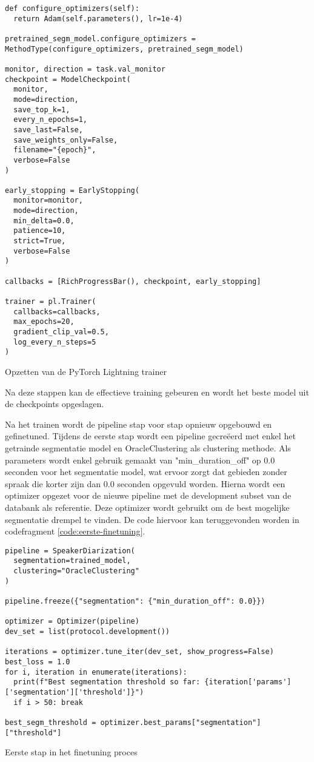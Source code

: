 \begin{listing}
	\begin{verbatim}
def configure_optimizers(self):
  return Adam(self.parameters(), lr=1e-4)
  
pretrained_segm_model.configure_optimizers = MethodType(configure_optimizers, pretrained_segm_model)

monitor, direction = task.val_monitor
checkpoint = ModelCheckpoint(
  monitor,
  mode=direction,
  save_top_k=1,
  every_n_epochs=1,
  save_last=False,
  save_weights_only=False,
  filename="{epoch}",
  verbose=False
)

early_stopping = EarlyStopping(
  monitor=monitor,
  mode=direction,
  min_delta=0.0,
  patience=10,
  strict=True,
  verbose=False
)

callbacks = [RichProgressBar(), checkpoint, early_stopping]

trainer = pl.Trainer(
  callbacks=callbacks,
  max_epochs=20,
  gradient_clip_val=0.5,
  log_every_n_steps=5
)
	\end{verbatim}
	\caption[PyTorch Lightning set-up]{\label{code:pl-setup}Opzetten van de PyTorch Lightning trainer}
\end{listing}

Na deze stappen kan de effectieve training gebeuren en wordt het beste model uit de checkpoints opgeslagen.

Na het trainen wordt de pipeline stap voor stap opnieuw opgebouwd en gefinetuned. Tijdens de eerste stap wordt een pipeline gecreëerd met enkel het getrainde segmentatie model en OracleClustering als clustering methode. Als parameters wordt enkel gebruik gemaakt van "min\_duration\_off" op 0.0 seconden voor het segmentatie model, wat ervoor zorgt dat gebieden zonder spraak die korter zijn dan 0.0 seconden opgevuld worden. Hierna wordt een optimizer opgezet voor de nieuwe pipeline met de development subset van de databank als referentie. Deze optimizer wordt gebruikt om de best mogelijke segmentatie drempel te vinden. De code hiervoor kan teruggevonden worden in codefragment \ref{code:eerste-finetuning}.

\begin{listing}
	\begin{verbatim}
pipeline = SpeakerDiarization(
  segmentation=trained_model,
  clustering="OracleClustering"
)

pipeline.freeze({"segmentation": {"min_duration_off": 0.0}})

optimizer = Optimizer(pipeline)
dev_set = list(protocol.development())

iterations = optimizer.tune_iter(dev_set, show_progress=False)
best_loss = 1.0
for i, iteration in enumerate(iterations):
  print(f"Best segmentation threshold so far: {iteration['params']['segmentation']['threshold']}")
  if i > 50: break
  
best_segm_threshold = optimizer.best_params["segmentation"]["threshold"]
	\end{verbatim}
	\caption[Set-up voor eerste finetuning]{\label{code:eerste-finetuning}Eerste stap in het finetuning proces}
\end{listing}

